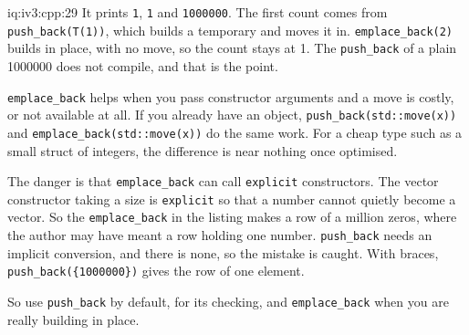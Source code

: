 \begin{solution}{iq:iv3:cpp:29}
It prints \texttt{1}, \texttt{1} and \texttt{1000000}. The first count comes from \texttt{push\_back(T(1))}, which builds a temporary and moves it in. \texttt{emplace\_back(2)} builds in place, with no move, so the count stays at 1. The \texttt{push\_back} of a plain 1000000 does not compile, and that is the point.

\texttt{emplace\_back} helps when you pass constructor arguments and a move is costly, or not available at all. If you already have an object, \texttt{push\_back(std::move(x))} and \texttt{emplace\_back(std::move(x))} do the same work. For a cheap type such as a small struct of integers, the difference is near nothing once optimised.

The danger is that \texttt{emplace\_back} can call \texttt{explicit} constructors. The vector constructor taking a size is \texttt{explicit} so that a number cannot quietly become a vector. So the \texttt{emplace\_back} in the listing makes a row of a million zeros, where the author may have meant a row holding one number. \texttt{push\_back} needs an implicit conversion, and there is none, so the mistake is caught. With braces, \texttt{push\_back(\{1000000\})} gives the row of one element.

So use \texttt{push\_back} by default, for its checking, and \texttt{emplace\_back} when you are really building in place.

\end{solution}

